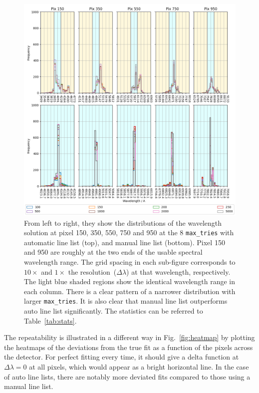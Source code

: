 \documentclass[fleqn,usenatbib]{rasti}
\begin{document}
\begin{figure}[h]
    \centering
    \includegraphics[width=\textwidth]{plots/figure_4_wavelengths.png}
    \caption{From left to right, they show the distributions of the wavelength
    solution at pixel 150, 350, 550, 750 and 950 at the 8 \texttt{max\_tries} with
    automatic line list (top), and manual line list (bottom). Pixel 150 and 950 are
    roughly at the two ends of the usable spectral wavelength range. The
    grid spacing in each sub-figure corresponds to $10\times$ and $1\times$ the
    resolution~($\Delta\lambda$) at that wavelength, respectively. The light blue
    shaded regions show the identical wavelength range in each column. There is a
    clear pattern of a narrower distribution with larger \texttt{max\_tries}. It
    is also clear that manual line list outperforms auto line list significantly.
    The statistics can be referred to Table~\ref{tab:stats}.}
    \label{fig:wavelengths}
\end{figure}

The repeatability is illustrated in a different way in Fig.~\ref{fig:heatmap} by
plotting the heatmaps of the deviations from the true fit as a function of the pixels
across the detector. For perfect fitting every time, it should give a delta function
at $\Delta \lambda = 0$ at all pixels, which would appear as a bright horizontal line.
In the case of auto line lists, there are notably more deviated fits compared to
those using a manual line list. 
\end{document}
